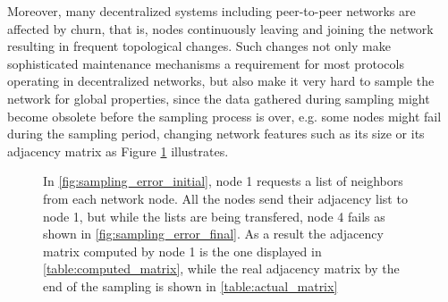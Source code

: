 \documentclass[a4paper,11pt,twoside]{report}
\begin{document}
Moreover, many decentralized systems including peer-to-peer networks are affected by churn, that is, nodes continuously leaving and joining the network resulting in frequent topological changes. Such changes not only make sophisticated maintenance mechanisms a requirement for most protocols operating in decentralized networks, but also make it very hard to sample the network for global properties, since the data gathered during sampling might become obsolete before the sampling process is over, e.g. some nodes might fail during the sampling period, changing network features such as its size or its adjacency matrix as Figure \ref{fig:sampling_error} illustrates.

\begin{figure}[h]
\centering
{}\hfill
{}\hfill
{} \hfill
{}

\caption{In \ref{fig:sampling_error_initial}, node 1 requests a list of neighbors from each network node. All the nodes send their adjacency list to node 1, but while the lists are being transfered, node 4 fails as shown in \ref{fig:sampling_error_final}. As a result the adjacency matrix computed by node 1 is the one displayed in \ref{table:computed_matrix}, while the real adjacency matrix by the end of the sampling is shown in \ref{table:actual_matrix}
\label{fig:sampling_error}}

\end{figure}
\end{document}

